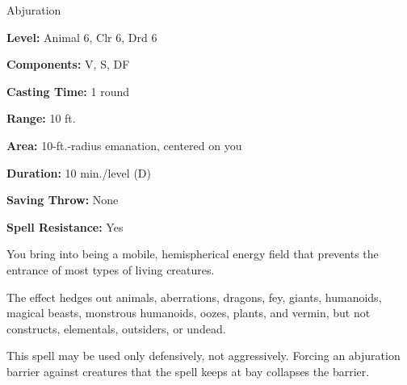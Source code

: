 
Abjuration

\textbf{Level:} Animal 6, Clr 6, Drd 6

\textbf{Components:} V, S, DF

\textbf{Casting Time:} 1 round

\textbf{Range:} 10 ft.

\textbf{Area:} 10-ft.-radius emanation, centered on you

\textbf{Duration:} 10 min./level (D)

\textbf{Saving Throw:} None

\textbf{Spell Resistance:} Yes

You bring into being a mobile, hemispherical energy field that prevents the entrance 
of most types of living creatures.

The effect hedges out animals, aberrations, dragons, fey, giants, humanoids, magical 
beasts, monstrous humanoids, oozes, plants, and vermin, but not constructs, elementals, 
outsiders, or undead.

This spell may be used only defensively, not aggressively. Forcing an abjuration 
barrier against creatures that the spell keeps at bay collapses the barrier.


